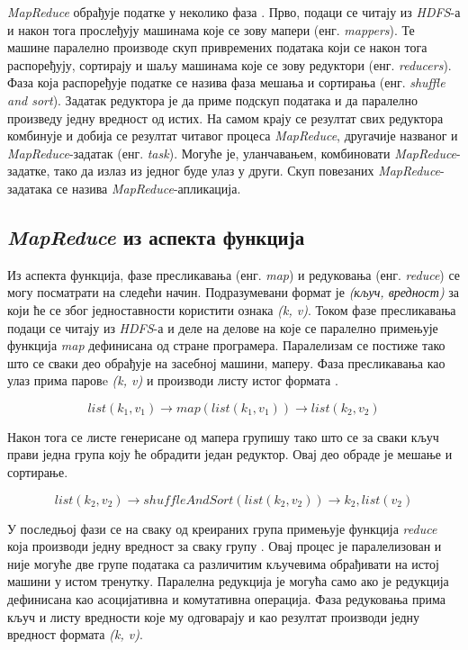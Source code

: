 \documentclass[12pt,oneside]{memoir}
\begin{document}
\textit{MapReduce} обрађује податке у неколико фаза \cite{hadoop_learning}. Прво, подаци се читају из \textit{HDFS}-а и након тога прослеђују машинама које се зову мапери (енг. \textit{mappers}). Те машине паралелно производе скуп привремених података који се након тога распоређују, сортирају и шаљу машинама које се зову редуктори (енг. \textit{reducers}). Фаза која распоређује податке се назива фаза мешања и сортирања (енг. \textit{shuffle and sort}). Задатак редуктора је да приме подскуп података и да паралелно произведу једну вредност од истих. На самом крају се резултат свих редуктора комбинује и добија се резултат читавог процеса \textit{MapReduce}, другачије названог и \textit{MapReduce}-задатак (енг. \textit{task}). Могуће је, уланчавањем, комбиновати \textit{MapReduce}-задатке, тако да излаз из једног буде улаз у други. Скуп повезаних \textit{MapReduce}-задатака се назива \textit{MapReduce}-апликација.

\subsection{\textit{MapReduce} из аспекта функција}
\label{subsec:mr_funck_asp}

Из аспекта функција, фазе пресликавања (енг. \textit{map}) и редуковања (енг. \textit{reduce}) се могу посматрати на следећи начин. Подразумевани формат је \textit{(кључ, вредност)} за који ће се због једноставности користити ознака \textit{(k, v)}. Током фазе пресликавања подаци се читају из \textit{HDFS}-а и деле на делове на које се паралелно примењује функција \textit{map} дефинисана од стране програмера. Паралелизам се постиже тако што се сваки део обрађује на засебној машини, маперу. Фаза пресликавања као улаз прима паровe \textit{(k, v)} и производи листу истог формата \cite{hadoop_learning}.

$$ list(k_1, v_1) \rightarrow map(list(k_1, v_1)) \rightarrow list(k_2, v_2) $$

Након тога се листе генерисане од мапера групишу тако што се за сваки кључ прави једна група коју ће обрадити један редуктор. Овај део обраде је мешање и сортирање. 

$$ list(k_2, v_2) \rightarrow shuffleAndSort(list(k_2, v_2)) \rightarrow k_2, list(v_2) $$

У последњој фази се на сваку од креираних група примењује функција \textit{reduce} која производи једну вредност за сваку групу \cite{hadoop_learning}. Овај процес је паралелизован и није могуће две групе података са различитим кључевима обрађивати на истој машини у истом тренутку. Паралелна редукција је могућа само ако је редукција дефинисана као асоцијативна и комутативна операција. Фаза редуковања прима кључ и листу вредности које му одговарају и као резултат производи једну вредност формата \textit{(k, v)}.
\end{document}
